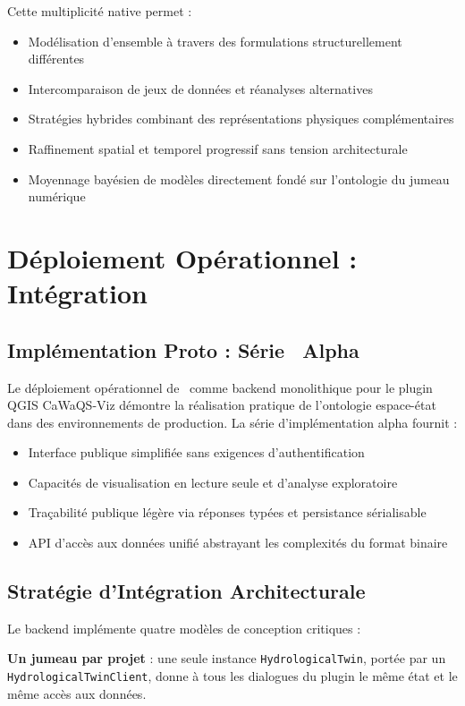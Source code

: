 Cette multiplicité native permet :
\begin{itemize}
\item Modélisation d'ensemble à travers des formulations structurellement différentes
\item Intercomparaison de jeux de données et réanalyses alternatives
\item Stratégies hybrides combinant des représentations physiques complémentaires
\item Raffinement spatial et temporel progressif sans tension architecturale
\item Moyennage bayésien de modèles directement fondé sur l'ontologie du jumeau numérique
\end{itemize}

\section*{Déploiement Opérationnel : Intégration \cwv}

\subsection*{Implémentation Proto : Série \hydrot\ Alpha}

Le déploiement opérationnel de \hydrot\ comme backend monolithique pour le plugin QGIS CaWaQS-Viz démontre la réalisation pratique de l'ontologie espace-état dans des environnements de production. La série d'implémentation alpha fournit :
\begin{itemize}
\item Interface publique simplifiée sans exigences d'authentification
\item Capacités de visualisation en lecture seule et d'analyse exploratoire
\item Traçabilité publique légère via réponses typées et persistance sérialisable
\item API d'accès aux données unifié abstrayant les complexités du format binaire
\end{itemize}

\subsection*{Stratégie d'Intégration Architecturale}

Le backend implémente quatre modèles de conception critiques :

\textbf{Un jumeau par projet} : une seule instance \texttt{HydrologicalTwin}, portée par un \texttt{HydrologicalTwinClient}, donne à tous les dialogues du plugin le même état et le même accès aux données.


